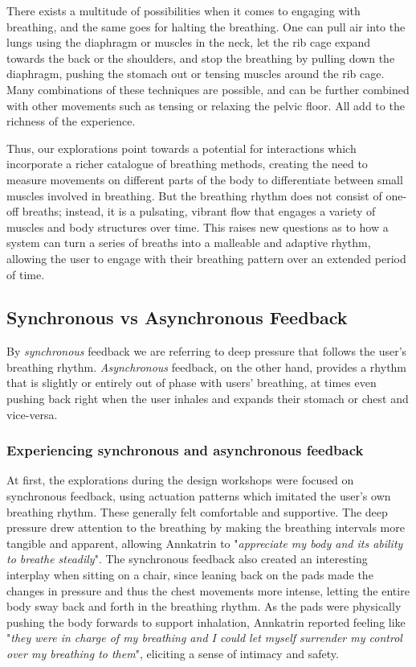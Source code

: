 There exists a multitude of possibilities when it comes to engaging with breathing, and the same goes for halting the breathing. One can pull air into the lungs using the diaphragm or muscles in the neck, let the rib cage expand towards the back or the shoulders, and stop the breathing by pulling down the diaphragm, pushing the stomach out or tensing muscles around the rib cage. Many combinations of these techniques are possible, and can be further combined with other movements such as tensing or relaxing the pelvic floor. All add to the richness of the experience.

Thus, our explorations point towards a potential for interactions which incorporate a richer catalogue of breathing methods, creating the need to measure movements on different parts of the body to differentiate between small muscles involved in breathing. But the breathing rhythm does not consist of one-off breaths; instead, it is a pulsating, vibrant flow that engages a variety of muscles and body structures over time. This raises new questions as to how a system can turn a series of breaths into a malleable and adaptive rhythm, allowing the user to engage with their breathing pattern over an extended period of time.


\subsection{Synchronous vs Asynchronous Feedback}

By \textit{synchronous} feedback we are referring to deep pressure that follows the user's breathing rhythm. \textit{Asynchronous} feedback, on the other hand, provides a rhythm that is slightly or entirely out of phase with users' breathing, at times even pushing back right when the user inhales and expands their stomach or chest and vice-versa.

\subsubsection{Experiencing synchronous and asynchronous feedback}

At first, the explorations during the design workshops were focused on synchronous feedback, using actuation patterns which imitated the user's own breathing rhythm. These generally felt comfortable and supportive. The deep pressure drew attention to the breathing by making the breathing intervals more tangible and apparent, allowing Annkatrin to "\textit{appreciate my body and its ability to breathe steadily}". The synchronous feedback also created an interesting interplay when sitting on a chair, since leaning back on the pads made the changes in pressure and thus the chest movements more intense, letting the entire body sway back and forth in the breathing rhythm. As the pads were physically pushing the body forwards to support inhalation, Annkatrin reported feeling like "\textit{they were in charge of my breathing and I could let myself surrender my control over my breathing to them}", eliciting a sense of intimacy and safety.

